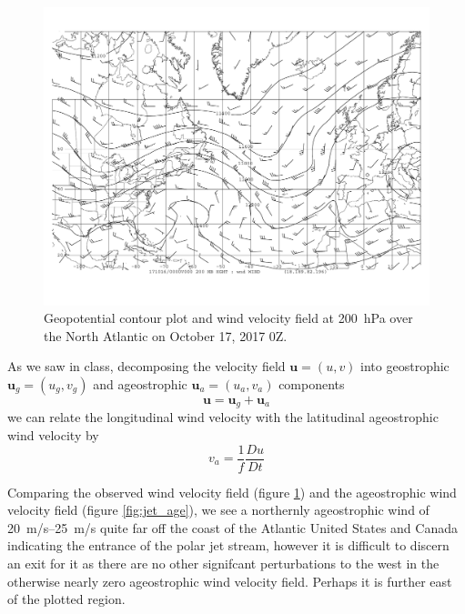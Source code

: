 \documentclass[11pt]{article}
\begin{document}
\begin{figure}[h!]
	\centering
	\includegraphics[trim={0.5cm 2cm 0.5cm 0},clip,width=\textwidth]{200hPa_hght_wind_jet_inout}
	\caption{Geopotential contour plot and wind velocity field at \SI{200}{\hecto\Pa} over the North Atlantic on October 17, 2017 0Z.}
	\label{fig:jet}
\end{figure}

As we saw in class, decomposing the velocity field $\bm{u} = (u,v)$ into geostrophic $\bm{u}_g = (u_g, v_g)$ and ageostrophic $\bm{u}_a = (u_a,v_a)$ components
\begin{equation*}
  \bm{u} = \bm{u}_g + \bm{u}_a
\end{equation*}
we can relate the longitudinal wind velocity with the latitudinal ageostrophic wind velocity by
\begin{equation*}
  v_a = \frac{1}{f} \frac{Du}{Dt}
\end{equation*}

Comparing the observed wind velocity field (figure \ref{fig:jet}) and the ageostrophic wind velocity field (figure \ref{fig:jet_age}), we see a northernly ageostrophic wind of \SIrange{20}{25}{\m/\s} quite far off the coast of the Atlantic United States and Canada indicating the entrance of the polar jet stream, however it is difficult to discern an exit for it as there are no other signifcant perturbations to the west in the otherwise nearly zero ageostrophic wind velocity field. Perhaps it is further east of the plotted region.
\end{document}
